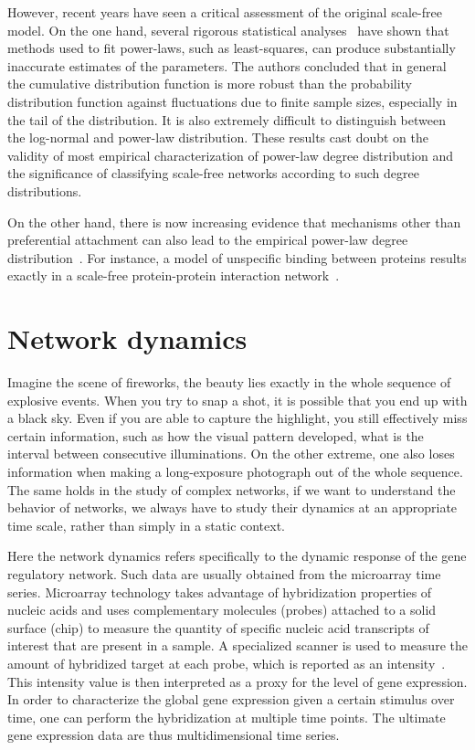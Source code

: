 However, recent years have seen a critical assessment of the original 
scale-free model. On the one hand, several rigorous statistical analyses~%
\citep{Clauset2009,Khanin2006a} have shown that methods used to fit power-laws, such as 
least-squares, can produce substantially inaccurate estimates of the 
parameters. The authors concluded that in general the cumulative distribution
function is more robust than the probability distribution function against 
fluctuations due to finite sample sizes, especially in the tail of the 
distribution. It is also extremely difficult to distinguish between
the log-normal and power-law distribution. These results cast doubt on the
validity of most empirical characterization of power-law degree distribution
and the significance of classifying scale-free networks according to such
degree distributions.

On the other hand, there is now increasing evidence that mechanisms other than
preferential attachment can also lead to the empirical power-law degree 
distribution~\citep{Caldarelli2002}. For instance, a model of unspecific 
binding between proteins results exactly in a scale-free protein-protein 
interaction network~\citep{Deeds2006}.

\section{Network dynamics}
Imagine the scene of fireworks, the beauty lies exactly in the whole sequence 
of explosive events. When you try to snap a shot, it is possible that you end up with
a black sky. Even if you are able to capture the highlight, you still 
effectively miss certain information, such as how the visual pattern developed,
what is the interval between consecutive illuminations. 
On the other extreme, one also loses information when making
a long-exposure photograph out of the whole sequence.
The same holds in the
study of complex networks, if we want to understand the behavior of networks,
we always have to study their dynamics at an appropriate time scale, 
rather than simply in a static context.

Here the network dynamics refers specifically to the dynamic response of the 
gene regulatory network. Such data are usually obtained from the microarray
time series. Microarray technology takes advantage of hybridization properties 
of nucleic acids and uses complementary molecules (probes) attached to a solid 
surface 
(chip) to measure the quantity of specific nucleic acid transcripts of 
interest that are present in a sample. A specialized scanner is used to 
measure the amount of hybridized target at each probe, which is reported as an 
intensity~\citep{Gentleman2005}. This intensity value is then interpreted as a
proxy for the level of gene expression. In order to characterize the global 
gene expression given a certain stimulus over time, one can perform the 
hybridization at multiple time points. The ultimate gene expression data are
thus multidimensional time series. 


